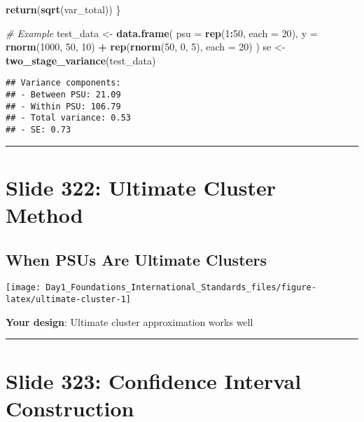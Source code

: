 \documentclass[
]{article}
\newenvironment{Shaded}{\begin{snugshade}}{\end{snugshade}}
\newcommand{\AttributeTok}[1]{\textcolor[rgb]{0.13,0.29,0.53}{#1}}
\newcommand{\CommentTok}[1]{\textcolor[rgb]{0.56,0.35,0.01}{\textit{#1}}}
\newcommand{\DecValTok}[1]{\textcolor[rgb]{0.00,0.00,0.81}{#1}}
\newcommand{\FunctionTok}[1]{\textcolor[rgb]{0.13,0.29,0.53}{\textbf{#1}}}
\newcommand{\NormalTok}[1]{#1}
\newcommand{\OtherTok}[1]{\textcolor[rgb]{0.56,0.35,0.01}{#1}}
\newcommand{\SpecialCharTok}[1]{\textcolor[rgb]{0.81,0.36,0.00}{\textbf{#1}}}
\begin{document}
\begin{Shaded}
\begin{Highlighting}[]
  \FunctionTok{return}\NormalTok{(}\FunctionTok{sqrt}\NormalTok{(var\_total))}
\NormalTok{\}}

\CommentTok{\# Example}
\NormalTok{test\_data }\OtherTok{\textless{}{-}} \FunctionTok{data.frame}\NormalTok{(}
  \AttributeTok{psu =} \FunctionTok{rep}\NormalTok{(}\DecValTok{1}\SpecialCharTok{:}\DecValTok{50}\NormalTok{, }\AttributeTok{each =} \DecValTok{20}\NormalTok{),}
  \AttributeTok{y =} \FunctionTok{rnorm}\NormalTok{(}\DecValTok{1000}\NormalTok{, }\DecValTok{50}\NormalTok{, }\DecValTok{10}\NormalTok{) }\SpecialCharTok{+} \FunctionTok{rep}\NormalTok{(}\FunctionTok{rnorm}\NormalTok{(}\DecValTok{50}\NormalTok{, }\DecValTok{0}\NormalTok{, }\DecValTok{5}\NormalTok{), }\AttributeTok{each =} \DecValTok{20}\NormalTok{)}
\NormalTok{)}
\NormalTok{se }\OtherTok{\textless{}{-}} \FunctionTok{two\_stage\_variance}\NormalTok{(test\_data)}
\end{Highlighting}
\end{Shaded}

\begin{verbatim}
## Variance components:
## - Between PSU: 21.09 
## - Within PSU: 106.79 
## - Total variance: 0.53 
## - SE: 0.73
\end{verbatim}

\begin{center}\rule{0.5\linewidth}{0.5pt}\end{center}

\section{Slide 322: Ultimate Cluster
Method}\label{slide-322-ultimate-cluster-method}

\subsection{When PSUs Are Ultimate
Clusters}\label{when-psus-are-ultimate-clusters}

\texttt{[image: Day1\_Foundations\_International\_Standards\_files/figure-latex/ultimate-cluster-1]}

\textbf{Your design}: Ultimate cluster approximation works well

\begin{center}\rule{0.5\linewidth}{0.5pt}\end{center}

\section{Slide 323: Confidence Interval
Construction}\label{slide-323-confidence-interval-construction}
\end{document}

